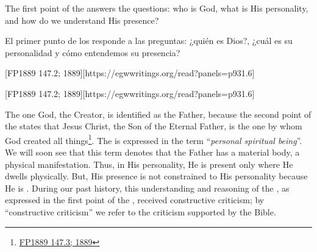 



The first point of the  answers the questions: who is God, what is His personality, and how do we understand His presence?


El primer punto de los  responde a las preguntas: ¿quién es Dios?, ¿cuál es su personalidad y cómo entendemos su presencia?


[FP1889 147.2; 1889][https://egwwritings.org/read?panels=p931.6]


[FP1889 147.2; 1889][https://egwwritings.org/read?panels=p931.6]


The one God, the Creator, is identified as the Father, because the second point of the  states that Jesus Christ, the Son of the Eternal Father, is the one by whom God created all things\footnote{\href{https://egwwritings.org/?ref=en_FP1889.147.3&para=931.7}{FP1889 147.3; 1889}}. The  is expressed in the term “\textit{personal spiritual being}”. We will soon see that this term denotes that the Father has a material body, a physical manifestation. Thus, in His personality, He is present only where He dwells physically. But, His presence is not constrained to His personality because He is . During our past history, this understanding and reasoning of the , as expressed in the first point of the , received constructive criticism; by “constructive criticism” we refer to the criticism supported by the Bible.



